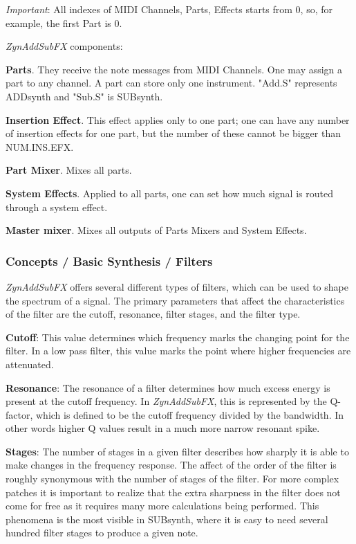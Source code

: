    \textsl{Important}:
   All indexes of MIDI Channels, Parts, Effects starts from 0, so, for
   example, the first Part is 0.

   \textsl{ZynAddSubFX} components:

   \begin{enumber}
      \item \textbf{Parts}.
         They receive the note messages from MIDI
         Channels. One may assign a part to any channel. A part can store
         only one instrument.  "Add.S" represents ADDsynth and "Sub.S" is
         SUBsynth.
      \item \textbf{Insertion Effect}.
         This effect applies only to one part; one can have any number of
         insertion effects for one part, but the number of these cannot be
         bigger than NUM.INS.EFX.
      \item \textbf{Part Mixer}.
         Mixes all parts.
      \item \textbf{System Effects}.
         Applied to all parts, one can set how much signal
         is routed through a system effect.
      \item \textbf{Master mixer}.
         Mixes all outputs of Parts Mixers and System Effects.
   \end{enumber}

\subsubsection{Concepts / Basic Synthesis / Filters}
\label{subsubsec:concepts_basics_filters}

   \textsl{ZynAddSubFX}
   offers several different types of filters, which can be used
   to shape the spectrum of a signal. The primary parameters that affect the
   characteristics of the filter are the cutoff, resonance, filter stages,
   and the filter type.

   \textbf{Cutoff}:
   This value determines which frequency marks the changing point for
   the filter. In a low pass filter, this value marks the point where higher
   frequencies are attenuated.

   \textbf{Resonance}:
   The resonance of a filter determines how much excess energy is
   present at the cutoff frequency. In \textsl{ZynAddSubFX},
   this is represented by the Q-factor, which is defined to be the cutoff
   frequency divided by the bandwidth. In other words higher Q values result
   in a much more narrow resonant spike.

   \textbf{Stages}:
   The number of stages in a given filter describes how sharply it is
   able to make changes in the frequency response.
   The affect of the order of the filter is roughly synonymous with the
   number of stages of the filter. For more complex patches it is important
   to realize that the extra sharpness in the filter does not come for free
   as it requires many more calculations being performed. This phenomena is
   the most visible in SUBsynth, where it is easy to need several hundred
   filter stages to produce a given note.

